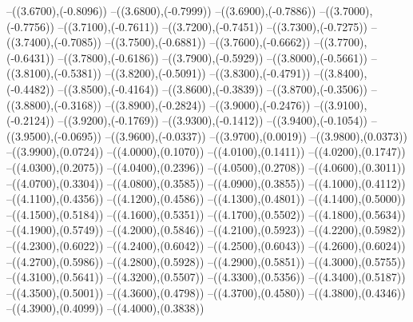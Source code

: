 {	--({\sx*(3.6700)},{\sy*(-0.8096)})
	--({\sx*(3.6800)},{\sy*(-0.7999)})
	--({\sx*(3.6900)},{\sy*(-0.7886)})
	--({\sx*(3.7000)},{\sy*(-0.7756)})
	--({\sx*(3.7100)},{\sy*(-0.7611)})
	--({\sx*(3.7200)},{\sy*(-0.7451)})
	--({\sx*(3.7300)},{\sy*(-0.7275)})
	--({\sx*(3.7400)},{\sy*(-0.7085)})
	--({\sx*(3.7500)},{\sy*(-0.6881)})
	--({\sx*(3.7600)},{\sy*(-0.6662)})
	--({\sx*(3.7700)},{\sy*(-0.6431)})
	--({\sx*(3.7800)},{\sy*(-0.6186)})
	--({\sx*(3.7900)},{\sy*(-0.5929)})
	--({\sx*(3.8000)},{\sy*(-0.5661)})
	--({\sx*(3.8100)},{\sy*(-0.5381)})
	--({\sx*(3.8200)},{\sy*(-0.5091)})
	--({\sx*(3.8300)},{\sy*(-0.4791)})
	--({\sx*(3.8400)},{\sy*(-0.4482)})
	--({\sx*(3.8500)},{\sy*(-0.4164)})
	--({\sx*(3.8600)},{\sy*(-0.3839)})
	--({\sx*(3.8700)},{\sy*(-0.3506)})
	--({\sx*(3.8800)},{\sy*(-0.3168)})
	--({\sx*(3.8900)},{\sy*(-0.2824)})
	--({\sx*(3.9000)},{\sy*(-0.2476)})
	--({\sx*(3.9100)},{\sy*(-0.2124)})
	--({\sx*(3.9200)},{\sy*(-0.1769)})
	--({\sx*(3.9300)},{\sy*(-0.1412)})
	--({\sx*(3.9400)},{\sy*(-0.1054)})
	--({\sx*(3.9500)},{\sy*(-0.0695)})
	--({\sx*(3.9600)},{\sy*(-0.0337)})
	--({\sx*(3.9700)},{\sy*(0.0019)})
	--({\sx*(3.9800)},{\sy*(0.0373)})
	--({\sx*(3.9900)},{\sy*(0.0724)})
	--({\sx*(4.0000)},{\sy*(0.1070)})
	--({\sx*(4.0100)},{\sy*(0.1411)})
	--({\sx*(4.0200)},{\sy*(0.1747)})
	--({\sx*(4.0300)},{\sy*(0.2075)})
	--({\sx*(4.0400)},{\sy*(0.2396)})
	--({\sx*(4.0500)},{\sy*(0.2708)})
	--({\sx*(4.0600)},{\sy*(0.3011)})
	--({\sx*(4.0700)},{\sy*(0.3304)})
	--({\sx*(4.0800)},{\sy*(0.3585)})
	--({\sx*(4.0900)},{\sy*(0.3855)})
	--({\sx*(4.1000)},{\sy*(0.4112)})
	--({\sx*(4.1100)},{\sy*(0.4356)})
	--({\sx*(4.1200)},{\sy*(0.4586)})
	--({\sx*(4.1300)},{\sy*(0.4801)})
	--({\sx*(4.1400)},{\sy*(0.5000)})
	--({\sx*(4.1500)},{\sy*(0.5184)})
	--({\sx*(4.1600)},{\sy*(0.5351)})
	--({\sx*(4.1700)},{\sy*(0.5502)})
	--({\sx*(4.1800)},{\sy*(0.5634)})
	--({\sx*(4.1900)},{\sy*(0.5749)})
	--({\sx*(4.2000)},{\sy*(0.5846)})
	--({\sx*(4.2100)},{\sy*(0.5923)})
	--({\sx*(4.2200)},{\sy*(0.5982)})
	--({\sx*(4.2300)},{\sy*(0.6022)})
	--({\sx*(4.2400)},{\sy*(0.6042)})
	--({\sx*(4.2500)},{\sy*(0.6043)})
	--({\sx*(4.2600)},{\sy*(0.6024)})
	--({\sx*(4.2700)},{\sy*(0.5986)})
	--({\sx*(4.2800)},{\sy*(0.5928)})
	--({\sx*(4.2900)},{\sy*(0.5851)})
	--({\sx*(4.3000)},{\sy*(0.5755)})
	--({\sx*(4.3100)},{\sy*(0.5641)})
	--({\sx*(4.3200)},{\sy*(0.5507)})
	--({\sx*(4.3300)},{\sy*(0.5356)})
	--({\sx*(4.3400)},{\sy*(0.5187)})
	--({\sx*(4.3500)},{\sy*(0.5001)})
	--({\sx*(4.3600)},{\sy*(0.4798)})
	--({\sx*(4.3700)},{\sy*(0.4580)})
	--({\sx*(4.3800)},{\sy*(0.4346)})
	--({\sx*(4.3900)},{\sy*(0.4099)})
	--({\sx*(4.4000)},{\sy*(0.3838)})
}
